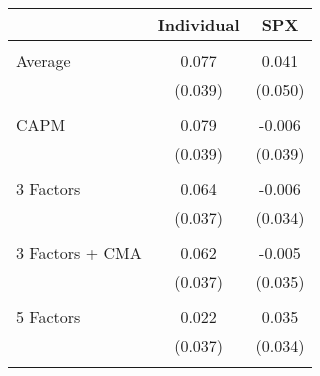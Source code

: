 \begin{tabular}{lcc}
\toprule 
 & Individual & SPX \\ 
\hline \\[-1.8ex] 
Average & 0.077 & 0.041 \\ 
 & (0.039) & (0.050) \\ \\[-1.8ex]
CAPM & 0.079 & -0.006 \\ 
 & (0.039) & (0.039) \\ \\[-1.8ex]
3 Factors & 0.064 & -0.006 \\ 
 & (0.037) & (0.034) \\ \\[-1.8ex]
3 Factors + CMA & 0.062 & -0.005 \\ 
 & (0.037) & (0.035) \\ \\[-1.8ex]
5 Factors & 0.022 & 0.035 \\ 
 & (0.037) & (0.034) \\ \\[-1.8ex]
\bottomrule 
\end{tabular}